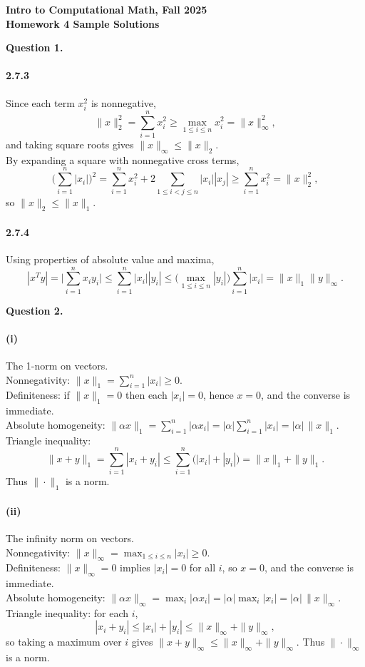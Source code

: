 \documentclass[11pt]{article}
\begin{document}
\begin{center}
{\bf Intro to Computational Math, Fall 2025\\
Homework 4 Sample Solutions}
\end{center}

{\bf Question 1.}
\paragraph{2.7.3}

Since each term $x_i^2$ is nonnegative,
\[
\|x\|_2^2=\sum_{i=1}^n x_i^2 \ge \max_{1\le i\le n} x_i^2=\|x\|_\infty^2,
\]
and taking square roots gives \(\|x\|_\infty\le \|x\|_2\).\\

\noindent By expanding a square with nonnegative cross terms,
\[
\Big(\sum_{i=1}^n |x_i|\Big)^2
=\sum_{i=1}^n x_i^2+2\sum_{1\le i<j\le n} |x_i||x_j|
\ge \sum_{i=1}^n x_i^2
=\|x\|_2^2,
\]
so \(\|x\|_2\le \|x\|_1\).

\paragraph{2.7.4}
Using properties of absolute value and maxima,
\[
|x^T y|
=\Big|\sum_{i=1}^n x_i y_i\Big|
\le \sum_{i=1}^n |x_i||y_i|
\le \Big(\max_{1\le i\le n} |y_i|\Big)\sum_{i=1}^n |x_i|
=\|x\|_1 \|y\|_\infty.
\]


\newpage



{\bf Question 2.}

\paragraph{(i)} The 1-norm on vectors.\\
Nonnegativity: \(\|x\|_1=\sum_{i=1}^n |x_i|\ge 0\).\\
Definiteness: if \(\|x\|_1=0\) then each \(|x_i|=0\), hence \(x=0\), and the converse is immediate.\\
Absolute homogeneity: \(\|\alpha x\|_1=\sum_{i=1}^n |\alpha x_i|=|\alpha|\sum_{i=1}^n |x_i|=|\alpha|\,\|x\|_1\).\\
Triangle inequality:
\[
\|x+y\|_1=\sum_{i=1}^n |x_i+y_i|\le \sum_{i=1}^n \big(|x_i|+|y_i|\big)=\|x\|_1+\|y\|_1.
\]
Thus \(\|\cdot\|_1\) is a norm.

\paragraph{(ii)} The infinity norm on vectors.\\
Nonnegativity: \(\|x\|_\infty=\max_{1\le i\le n} |x_i|\ge 0\).\\
Definiteness: \(\|x\|_\infty=0\) implies \(|x_i|=0\) for all \(i\), so \(x=0\), and the converse is immediate.\\
Absolute homogeneity: \(\|\alpha x\|_\infty=\max_i |\alpha x_i|=|\alpha|\max_i |x_i|=|\alpha|\,\|x\|_\infty\).\\
Triangle inequality: for each \(i\),
\[
|x_i+y_i|\le |x_i|+|y_i|\le \|x\|_\infty+\|y\|_\infty,
\]
so taking a maximum over \(i\) gives \(\|x+y\|_\infty\le \|x\|_\infty+\|y\|_\infty\).
Thus \(\|\cdot\|_\infty\) is a norm.
\end{document}
